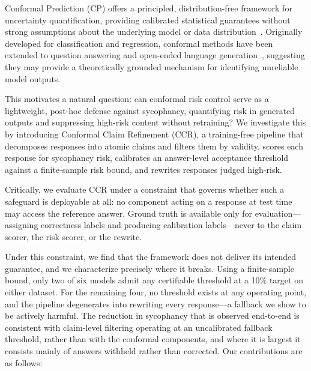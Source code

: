 \documentclass[sigconf, review, anonymous]{acmart}
\begin{document}
Conformal Prediction (CP) offers a principled, distribution-free framework
for uncertainty quantification, providing calibrated statistical guarantees
without strong assumptions about the underlying model or data
distribution~\citep{vovk2005algorithmic,angelopoulos2023gentle}. Originally developed for
classification and regression, conformal methods have been extended to
question answering and open-ended language
generation~\citep{quach2024conformal,mohri2024language}, suggesting they may provide a theoretically
grounded mechanism for identifying unreliable model outputs.

This motivates a natural question: can conformal risk control serve as a
lightweight, post-hoc defense against sycophancy, quantifying risk in
generated outputs and suppressing high-risk content without retraining? We
investigate this by introducing Conformal Claim Refinement (CCR), a
training-free pipeline that decomposes responses into atomic claims and
filters them by validity, scores each response for sycophancy risk,
calibrates an answer-level acceptance threshold against a
finite-sample risk bound, and rewrites responses judged high-risk.

Critically, we evaluate CCR under a constraint that governs whether such a
safeguard is deployable at all: no component acting on a response at test
time may access the reference answer. Ground truth is available only for
evaluation---assigning correctness labels and producing calibration
labels---never to the claim scorer, the risk scorer, or the rewrite.

Under this constraint, we find that the framework does not deliver its
intended guarantee, and we characterize precisely where it breaks. Using a
finite-sample bound, only two of six models admit any certifiable
threshold at a 10\% target on either dataset. For the remaining four, no
threshold exists at any operating point, and the pipeline degenerates into
rewriting every response---a fallback we show to be actively harmful. The
reduction in sycophancy that is observed end-to-end is consistent with
claim-level filtering operating at an uncalibrated fallback threshold,
rather than with the conformal components, and where it is largest it
consists mainly of answers withheld rather than corrected. Our
contributions are as follows:
\end{document}
